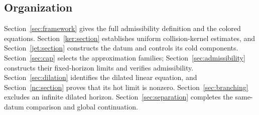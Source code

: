 \subsection{Organization}

Section~\ref{sec:framework} gives the full admissibility definition and
the colored equations. Section~\ref{ker:section} establishes uniform
collision-kernel estimates, and Section~\ref{jet:section} constructs the
datum and controls its cold components. Section~\ref{sec:cap} selects
the approximation families; Section~\ref{sec:admissibility} constructs
their fixed-horizon limits and verifies admissibility.
Section~\ref{sec:dilation} identifies the dilated linear equation, and
Section~\ref{nc:section} proves that its hot limit is nonzero.
Section~\ref{sec:branching} excludes an infinite dilated horizon.
Section~\ref{sec:separation} completes the same-datum comparison and
global continuation.
